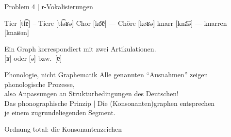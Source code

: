 \begin{frame}
  {Problem 4 | r-Vokalisierungen}
  \onslide<+->
  \onslide<+->
  \begin{exe}
    \ex Tie\alert{r} [ti͡ɐ] -- Tie\alert{r}e [ti͡əʁə]
    \ex Cho\alert{r} [ko͡ɐ] --- Chö\alert{r}e [køʁə]
    \ex kna\alert{rr} [kna͡ə] --- kna\alert{rr}en [knaʁən]
  \end{exe}
  \onslide<+->
  \Zeile
  \alert{Ein Graph} korrespondiert mit \alert{zwei Artikulationen}.\\
  \alert{[ʁ] oder [ə] bzw.\ [ɐ]} 
\end{frame}

\begin{frame}
  {Phonologie, nicht Graphematik}
  \onslide<+->
  \onslide<+->
  Alle genannten "`Ausnahmen"' zeigen \alert{phonologische Prozesse},\\
  also Anpassungen an Strukturbedingungen des Deutschen!\\
  \onslide<+->
  \Zeile
  Das phonographische Prinzip | Die \alert{(Konsonanten)graphen} entsprechen\\
  je einem \alert{zugrundeliegenden Segment}.
\end{frame}

\begin{frame}
  {Ordnung total: die Konsonantenzeichen}
  \pause
  \centering
\end{frame}

